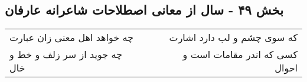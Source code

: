 \begin{center}
\section*{بخش ۴۹ - سال از معانی اصطلاحات شاعرانه عارفان}
\label{sec:sh049}
\begin{longtable}{l p{0.5cm} r}
چه خواهد اهل معنی زان عبارت
&&
که سوی چشم و لب دارد اشارت
\\
چه جوید از سر زلف و خط و خال
&&
کسی که اندر مقامات است و احوال
\\
\end{longtable}
\end{center}
